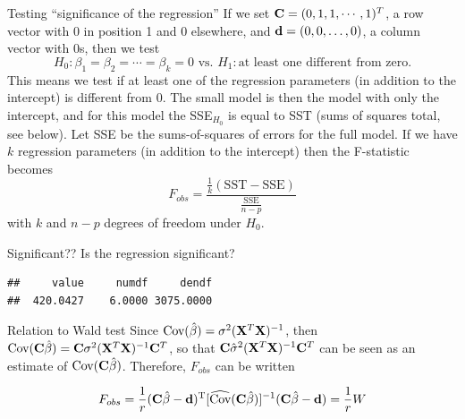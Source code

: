 \documentclass[
  ignorenonframetext,
]{beamer}
\newenvironment{Shaded}{\begin{snugshade}}{\end{snugshade}}
\newcommand{\FunctionTok}[1]{\textcolor[rgb]{0.13,0.29,0.53}{\textbf{#1}}}
\newcommand{\NormalTok}[1]{#1}
\newcommand{\SpecialCharTok}[1]{\textcolor[rgb]{0.81,0.36,0.00}{\textbf{#1}}}
\begin{document}
\begin{frame}{Testing ``significance of the regression''}
\label{testing-significance-of-the-regression}
If we set \({\bf C}=(0,1,1, \cdots ,1)^T\), a row vector with 0 in
position 1 and 0 elsewhere, and \({\bf d}=(0,0,\ldots,0)\), a column
vector with 0s, then we test
\[ H_0: \beta_1=\beta_2=\cdots= \beta_k =0 \text{ vs. } H_1: \text{at least one different from zero}.\]
This means we test if at least one of the regression parameters (in
addition to the intercept) is different from 0. The small model is then
the model with only the intercept, and for this model the SSE\(_{H_0}\)
is equal to SST (sums of squares total, see below). Let SSE be the
sums-of-squares of errors for the full model. If we have \(k\)
regression parameters (in addition to the intercept) then the
F-statistic becomes
\[ F_{obs}=\frac{\frac{1}{k}(\text{SST}-\text{SSE})}{\frac{\text{SSE}}{n-p}}\]
with \(k\) and \(n-p\) degrees of freedom under \(H_0\).
\end{frame}

\begin{frame}[fragile]{Significant??}
\label{significant}
Is the regression significant?

\begin{Shaded}
\end{Shaded}

\begin{verbatim}
##     value     numdf     dendf 
##  420.0427    6.0000 3075.0000
\end{verbatim}
\end{frame}

\begin{frame}{Relation to Wald test}
\label{relation-to-wald-test}
Since \(\text{Cov}(\hat{\beta})=\sigma^2 ({\bf X}^T{\bf X})^{-1}\), then
\(\text{Cov}({\bf C}\hat{\beta})={\bf C}\sigma^2({\bf X}^T{\bf X})^{-1}{\bf C}^T\),
so that \({\bf C}\hat{\sigma}^2({\bf X}^T{\bf X})^{-1}{\bf C}^T\) can be
seen as an estimate of \(\text{Cov}({\bf C}\hat{\beta})\). Therefore,
\(F_{obs}\) can be written

\[F_{obs}=\frac{1}{r}({\bf C}\hat{ {\bf \beta}}-{\bf d})^{\text T}[\widehat{\text{Cov}}({\bf C}\hat{\beta})]^{-1}({\bf C}\hat{ {\bf \beta}}-{\bf d})=\frac{1}{r}W\]
\end{frame}
\end{document}

